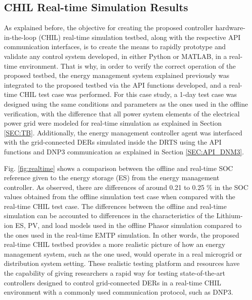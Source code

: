
\subsection{CHIL Real-time Simulation Results}

As explained before, the objective for creating the proposed controller hardware-in-the-loop (CHIL) real-time simulation testbed, along with the respective API communication interfaces, is to create the means to rapidly prototype and validate any control system developed, in either Python or MATLAB, in a real-time environment. That is why, in order to verify the correct operation of the proposed testbed, the energy management system explained previously was integrated to the proposed testbed via the API functions developed, and a real-time CHIL test case was performed. For this case study, a 1-day test case was designed using the same conditions and parameters as the ones used in the offline verification, with the difference that all power system elements of the electrical power grid were modeled for real-time simulation as explained in Section \ref{SEC:TB}. Additionally,  the energy management controller agent was interfaced with the grid-connected DERs simulated inside the DRTS using the API functions and DNP3 communication as explained in Section \ref{SEC:API_DNM3}. 

Fig. \ref{fig:realtime} shows a comparison between the offline and real-time SOC reference given to the energy storage (ES) from the energy management controller. As observed, there are differences of around 0.21 to 0.25 \%  in the SOC values obtained from the offline simulation test case when compared with the real-time CHIL test case. The differences between the offline and real-time simulation can be accounted to differences in the characteristics of the Lithium-ion ES, PV, and load models used in the offline Phasor simulation compared to the ones used in the real-time EMTP simulation. In other words, the proposed real-time CHIL testbed provides a more realistic picture of how an energy management system, such as the one used, would operate in a real microgrid or distribution system setting. These realistic testing platform and resources have the capability of giving researchers a rapid way for testing state-of-the-art controllers designed to control grid-connected DERs in a real-time CHIL environment with a commonly used communication protocol, such as DNP3.


 




